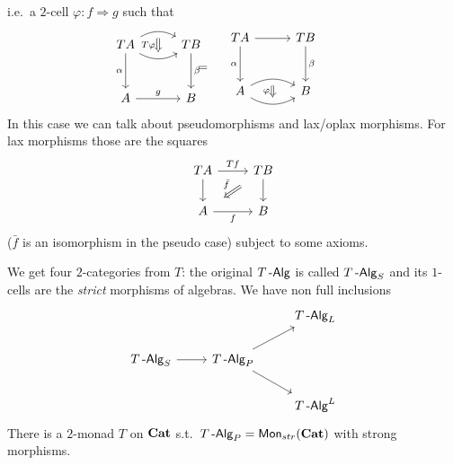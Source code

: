 \documentclass[a4paper,11pt,oneside,openany]{scrbook}
\begin{document}
\begin{exmp}
\begin{enumerate}
\[		      \]
		      i.e.\ a $2$-cell $\varphi\colon f\Rightarrow g$ such that
		      \[
			      \begin{minipage}{0.3\linewidth}
				      \begin{tikzcd}[row sep=1cm, column sep=1cm]
					      TA\arrow[d, "\alpha"'] \arrow[r, bend right, ""{name=D, anchor=center}] \arrow[r, bend left, ""{name=U, anchor=center}] & TB \arrow[d, "\beta"] \\
					      A\arrow[r, "g"]            &B
					      \ar[Rightarrow, shorten <= .3em, shorten >= .3em, "T\varphi"', from=U, to=D]
				      \end{tikzcd}
			      \end{minipage}
			      \hspace{-1.3cm}
			      =
			      \hspace{.4cm}
			      \begin{minipage}{0.3\linewidth}
				      \begin{tikzcd}[row sep=1cm, column sep=1cm]
					      TA\arrow[d, "\alpha"'] \arrow[r]                        &  TB\arrow[d, "\beta"] \\
					      A\arrow[r, bend right, ""{name=D, anchor=center}] \arrow[r, bend left, ""{name=U, anchor=center}] &      B
					      \ar[Rightarrow, shorten <= .3em, shorten >= .3em, "\varphi"', from=U, to=D]
				      \end{tikzcd}
			      \end{minipage}
		      \]
		      In this case we can talk about pseudomorphisms and lax/oplax morphisms. For lax morphisms those are the squares
		      \[
			      \begin{tikzcd}
				      TA\arrow[d]\arrow["Tf"]{r}
				      & TB\arrow[d] \arrow[dl, Rightarrow, shorten <= 1em, shorten >= 1em, "\bar{f}"']  \\
				      A\arrow["f"']{r}
				      & B
			      \end{tikzcd}
		      \]
		      ($\bar{f}$ is an isomorphism in the pseudo case) subject to some axioms.
	\end{enumerate}
\end{exmp}
We get four $2$-categories from $T$: the original $T\operatorname{-\mathsf{Alg}}$ is called $T\operatorname{-\mathsf{Alg}}_S$ and its $1$-cells are the \emph{strict} morphisms of algebras. We have non full inclusions
\[
	\begin{tikzcd}
		&& T\Alg_L\\
		T\Alg_S \arrow[r]
		& T\Alg_P \arrow[ur]    \arrow[dr] \\
		&& T\Alg^L
	\end{tikzcd}
\]
There is a $2$-monad $T$ on ${\normalfont\textbf{Cat}}$ s.t.\ $T\operatorname{-\mathsf{Alg}}_P=\operatorname{\mathsf{Mon}}_{str}({\normalfont\textbf{Cat}})$ with strong morphisms.
\end{document}

